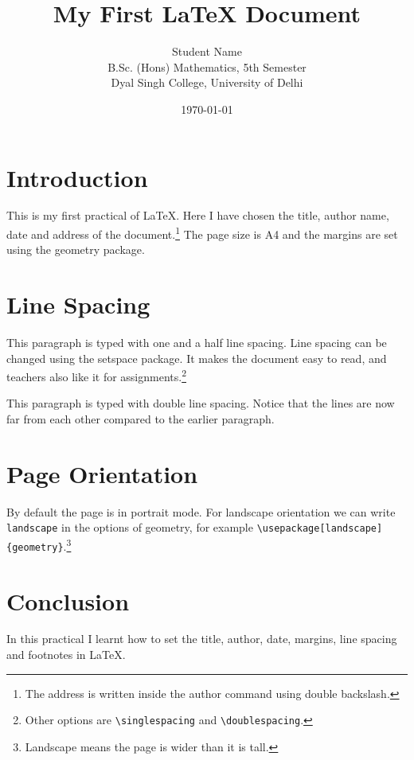 \documentclass[12pt,a4paper]{article}
\title{My First \LaTeX{} Document}
\author{Student Name \\ B.Sc. (Hons) Mathematics, 5th Semester \\ Dyal Singh College, University of Delhi}
\date{\today}
\begin{document}
\maketitle

\section{Introduction}
This is my first practical of \LaTeX{}. Here I have chosen the title, author name, date and address of the document.\footnote{The address is written inside the author command using double backslash.}
The page size is A4 and the margins are set using the geometry package.

\section{Line Spacing}
\onehalfspacing
This paragraph is typed with one and a half line spacing. Line spacing can be changed using the setspace package. It makes the document easy to read, and teachers also like it for assignments.\footnote{Other options are \texttt{\textbackslash singlespacing} and \texttt{\textbackslash doublespacing}.}

\doublespacing
This paragraph is typed with double line spacing. Notice that the lines are now far from each other compared to the earlier paragraph.

\singlespacing
\section{Page Orientation}
By default the page is in portrait mode. For landscape orientation we can write \texttt{landscape} in the options of geometry, for example \texttt{\textbackslash usepackage[landscape]\{geometry\}}.\footnote{Landscape means the page is wider than it is tall.}

\section{Conclusion}
In this practical I learnt how to set the title, author, date, margins, line spacing and footnotes in \LaTeX{}.
\end{document}
